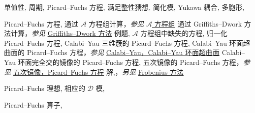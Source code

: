 \begin{theindex}
\subsubitem \leavevmode\hypertarget{idx:1028}{单值性},\enspace{}
\subsubitem \leavevmode\hypertarget{idx:1029}{周期},\enspace{}
\subsubitem \leavevmode\hypertarget{idx:1030}{Picard--Fuchs 方程},\enspace{}
\subsubitem \leavevmode\hypertarget{idx:1031}{满足整性猜想},\enspace{}
\subsubitem \leavevmode\hypertarget{idx:1032}{简化模},\enspace{}
\subsubitem \leavevmode\hypertarget{idx:1033}{Yukawa 耦合},\enspace{}
\subitem \leavevmode\hypertarget{idx:1034}{多胞形},\enspace{}
\indexspace
\item \leavevmode\hypertarget{idx:1049}{Picard--Fuchs 方程},\enspace{}
\subitem \leavevmode\hypertarget{idx:1050}{通过 $\mathcal A$ 方程组计算}，\textit{参见} \hyperlink{idx:0055}{$\mathcal A$ 方程组}
\subitem \leavevmode\hypertarget{idx:1051}{通过 Griffiths--Dwork 方法计算}，\textit{参见} \hyperlink{idx:0486}{Griffiths--Dwork 方法}
\subitem \leavevmode\hypertarget{idx:1052}{例题},\enspace{}
\subitem \leavevmode\hypertarget{idx:1053}{$\mathcal A$ 方程组中缺失的方程},\enspace{}
\subitem \leavevmode\hypertarget{idx:1054}{归一化 Picard--Fuchs 方程},\enspace{}
\subitem \leavevmode\hypertarget{idx:1055}{Calabi--Yau 三维簇的 Picard--Fuchs 方程},\enspace{}
\subitem \leavevmode\hypertarget{idx:1056}{Calabi--Yau 环面超曲面的 Picard--Fuchs 方程}，\textit{参见} \hyperlink{idx:0099}{Calabi--Yau，Calabi--Yau 环面超曲面}
\subitem \leavevmode\hypertarget{idx:1057}{Calabi--Yau 环面完全交的镜像的 Picard--Fuchs 方程},\enspace{}
\subitem \leavevmode\hypertarget{idx:1058}{五次镜像的 Picard--Fuchs 方程}，\textit{参见} \hyperlink{idx:1175}{五次镜像，Picard--Fuchs 方程}
\subitem \leavevmode\hypertarget{idx:1059}{解},\enspace{}，\textit{另见} \hyperlink{idx:0344}{Frobenius 方法}
\indexspace
\item \leavevmode\hypertarget{idx:1060}{Picard--Fuchs 理想},\enspace{}
\subitem \leavevmode\hypertarget{idx:1061}{相应的 $\mathcal D$ 模},\enspace{}
\indexspace
\item \leavevmode\hypertarget{idx:1062}{Picard--Fuchs 算子},\enspace{}

\end{theindex}
